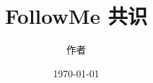 \documentclass[dvipsnames]{ctexart}
\title{FollowMe 共识}
\date{\today}
\author{作者}
\newcommand{\mycola}{MidnightBlue}
\newcommand{\cola}[1]{\textcolor{\mycola}{#1}}
\newcommand{\Cola}[1]{\textcolor{\mycola}{\textbf{#1}}}
\begin{document}
\maketitle


\begin{comment}


\section{静态节点集群共识}

很多教科书里的集群都是基于\Cola{静态集群}的，也就是说集群节点的数量从头到尾都不变，
而且是已知的。这些共识包括：Raft，PBFT 等等。它们多多少少都要依赖一个``投票''的机制。

\emoji{parrot} : 确实，你得知道有一共有多少人才能知道\cola{“大多数”}是多少人。

\begin{center}
  \begin{tikzpicture}
    \matrix[column sep=1cm,row sep=1cm,nodes={myNode,fill=gray}]{
      \node[name=a1]{1}; & 
      \node[name=a2]{2}; \\
      \node[name=a3]{3}; & 
      \node[name=a4]{4}; \\
    };

    \foreach \i / \j in {1/2,1/3,1/4,2/3,2/4,3/4}{
      \draw[thick,latex-latex] (a\j) -- (a\i);
    }

  \end{tikzpicture}
\end{center}

那么对于这样的共识他们的网络应该是这样的:
\begin{simplepy}
from abc import ABC
class IStaticIdBasedNetworkable(ABC):
    def listen(self,
               target: str,
               handler: Callable[[int,str],Optional[str]]
               ):
        pass
    def my_id(self) -> int:
        pass
    def all_ids(self) -> list[int]:
        pass
    def send(self,i: int, target: str, data: str) -> Optional[str]:
        # i: the target, e.g. 2
        # target: e.g. "/hi"
        pass
    def clear(self):                # clears up all the listeners
        pass
\end{simplepy}
那么我们看到大部分和之前\texttt{IEndpointBasedNetworkable}是一样的，有才华的同学
可能想把这两个写成一个\texttt{template<T>}，不过请暂时先别。

\section{例子: Raft 共识实现}
那么基于上面的这个接口，我们的Raft共识应该就是这样的：
\begin{simplepy}
class RaftConsensus:
    def __init__(self,
                 n: IStaticIdBasedNetworkable,
                 e: IExecutable):
        self.net = n
        self.exe = e
        self.lock_for_patience = Lock()
        self.primary = None
        self.dynasty = 0
        self.voted_dynasty = dict()
        self.lock_for_voted_dynasty = Lock()


\end{comment}
\end{document}
